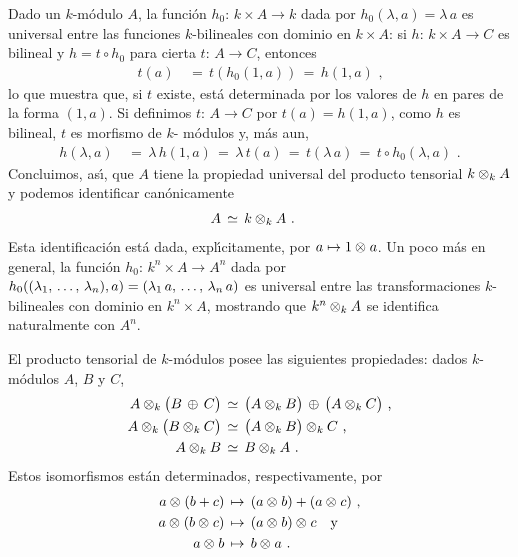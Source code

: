 \begin{ejemploProductoTensorialDeModulos}%
	\label{ejemplo:productotensorialdemodulos}
	Dado un $k$-m\'{o}dulo $A$, la funci\'{o}n
	$h_0:\,k\times A\rightarrow k$ dada por $h_0(\lambda,a)=\lambda\,a$ es
	universal entre las funciones $k$-bilineales con dominio en
	$k\times A$: si $h:\,k\times A\rightarrow C$ es bilineal y
	$h=t\circ h_0$ para cierta $t:\,A\rightarrow C$, entonces
	\begin{align*}
		t(a) & \,=\,t(h_0(1,a)) \,=\,h(1,a)
		\text{ ,}
	\end{align*}
	lo que muestra que, si $t$ existe, est\'{a} determinada por los valores
	de $h$ en pares de la forma $(1,a)$. Si definimos $t:\,A\rightarrow C$
	por $t(a)=h(1,a)$, como $h$ es bilineal, $t$ es morfismo de $k$-%
	m\'{o}dulos y, m\'{a}s aun,
	\begin{align*}
		h(\lambda,a) & \,=\,\lambda\,h(1,a)\,=\,\lambda\,t(a)\,=\,
			t(\lambda\,a)\,=\,t\circ h_0(\lambda,a)
		\text{ .}
	\end{align*}
	Concluimos, as\'{\i}, que $A$ tiene la propiedad universal del producto
	tensorial $k\tensor[k]A$ y podemos identificar can\'{o}nicamente
	\begin{align*}
		A & \,\simeq\,k\tensor[k]A
		\text{ .}
	\end{align*}
	Esta identificaci\'{o}n est\'{a} dada, expl\'{\i}citamente, por
	$a\mapsto 1\tensor a$. Un poco m\'{a}s en general, la funci\'{o}n
	$h_0:\,k^n\times A\rightarrow A^n$ dada por
	$h_0((\lista{\lambda}{n}),a)=(\lambda_1\,a,\,\dots,\,\lambda_n\,a)$ es
	universal entre las transformaciones $k$-bilineales con dominio en
	$k^n\times A$, mostrando que $k^n\tensor[k]A$ se identifica
	naturalmente con $A^n$.
\end{ejemploProductoTensorialDeModulos}

\begin{propoProductoTensorialDeModulos}\label{propo:productotensorialdemodulos}
	El producto tensorial de $k$-m\'{o}dulos posee las siguientes
	propiedades: dados $k$-m\'{o}dulos $A$, $B$ y $C$,
	\begin{align*}
		A\tensor[k]\big(B\,\oplus\,C\big) & \,\simeq\,
			\big(A\tensor[k]B\big)\,\oplus\,
			\big(A\tensor[k]C\big) \text{ ,} \\
		A\tensor[k]\big(B\tensor[k] C\big) & \,\simeq\,
			\big(A\tensor[k]B\big)\tensor[k]C \text{ ,} \\
		A\tensor[k]B & \,\simeq\,B\tensor[k]A
		\text{ .}
	\end{align*}
	Estos isomorfismos est\'{a}n determinados, respectivamente, por
	\begin{align*}
		a\tensor(b+c) & \,\mapsto\,(a\tensor b)+(a\tensor c)
			\text{ ,} \\
		a\tensor(b\tensor c) & \,\mapsto\,(a\tensor b)\tensor c
			\quad\text{y} \\
		a\tensor b & \,\mapsto\,b\tensor a
		\text{ .}
	\end{align*}
\end{propoProductoTensorialDeModulos}

